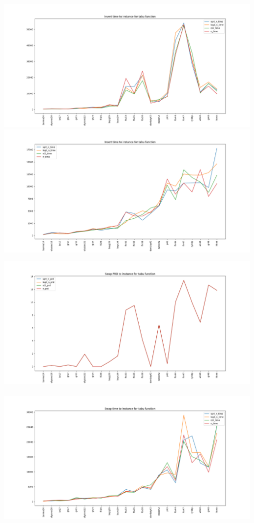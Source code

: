 \documentclass{article}
\begin{document}
\begin{multicols}{2}
\begin{center}
    \includegraphics[scale=0.2]{tabu_inv_time.png}
    \includegraphics[scale=0.2]{tabu_ins_time.png}

  \end{center}
\end{multicols}

\begin{multicols}{2}
    \begin{center}
      \includegraphics[scale=0.2]{tabu_swp_prd.png}
      \\~\\
      \includegraphics[scale=0.2]{tabu_swp_time.png}
    \end{center}
  \end{multicols}
\end{document}
